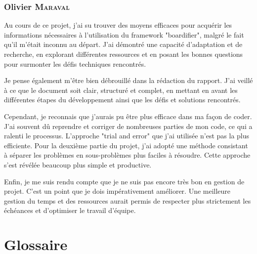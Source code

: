 \subsection*{Olivier \textsc{Maraval}}

Au cours de ce projet, j'ai su trouver des moyens efficaces pour acquérir les informations nécessaires à l'utilisation du framework "boardifier", malgré le fait qu'il m'était inconnu au départ. J'ai démontré une capacité d'adaptation et de recherche, en explorant différentes ressources et en posant les bonnes questions pour surmonter les défis techniques rencontrés.

Je pense également m'être bien débrouillé dans la rédaction du rapport. J'ai veillé à ce que le document soit clair, structuré et complet, en mettant en avant les différentes étapes du développement ainsi que les défis et solutions rencontrés.

Cependant, je reconnais que j'aurais pu être plus efficace dans ma façon de coder. J'ai souvent dû reprendre et corriger de nombreuses parties de mon code, ce qui a ralenti le processus. L'approche "trial and error" que j'ai utilisée n'est pas la plus efficiente. Pour la deuxième partie du projet, j'ai adopté une méthode consistant à séparer les problèmes en sous-problèmes plus faciles à résoudre. Cette approche s'est révélée beaucoup plus simple et productive.

Enfin, je me suis rendu compte que je ne suis pas encore très bon en gestion de projet. C'est un point que je dois impérativement améliorer. Une meilleure gestion du temps et des ressources aurait permis de respecter plus strictement les échéances et d'optimiser le travail d'équipe.

\chapter{Glossaire}
\setcounter{page}{1}
\renewcommand{\thepage}{\Roman{page}}

